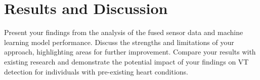 
\section{Results and Discussion}

Present your findings from the analysis of the fused sensor data and machine learning model performance.
Discuss the strengths and limitations of your approach, highlighting areas for further improvement.
Compare your results with existing research and demonstrate the potential impact of your findings on VT detection for individuals with pre-existing heart conditions.